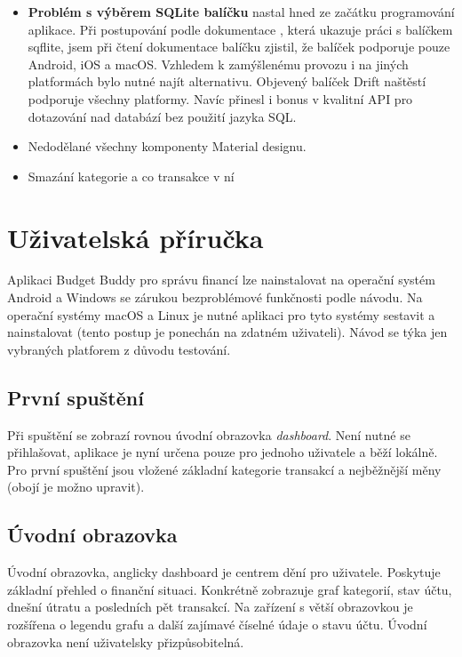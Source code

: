 \documentclass[
  biblatex,
  figures=true,
  tables=false,
  glossaries,
  index
]{kidiplom}
\begin{document}
\begin{itemize}
  \item \textbf{Problém s výběrem SQLite balíčku} nastal hned ze začátku programování aplikace. Při postupování podle dokumentace \cite{flutter-docs}, která ukazuje práci s balíčkem sqflite, jsem při čtení dokumentace balíčku zjistil, že balíček podporuje pouze Android, iOS a macOS. Vzhledem k zamýšlenému provozu i na jiných platformách bylo nutné najít alternativu. Objevený balíček Drift naštěstí podporuje všechny platformy. Navíc přinesl i bonus v kvalitní API pro dotazování nad databází bez použití jazyka SQL.
  \item Nedodělané všechny komponenty Material designu.
  \item Smazání kategorie a co transakce v ní
\end{itemize}

\section{Uživatelská příručka}
Aplikaci Budget Buddy pro správu financí lze nainstalovat na operační systém Android a Windows se zárukou bezproblémové funkčnosti podle návodu. Na operační systémy macOS a Linux je nutné aplikaci pro tyto systémy sestavit a nainstalovat (tento postup je ponechán na zdatném uživateli). Návod se týka jen vybraných platforem z důvodu testování. 

\subsection{První spuštění}
Při spuštění se zobrazí rovnou úvodní obrazovka \textit{dashboard}. Není nutné se přihlašovat, aplikace je nyní určena pouze pro jednoho uživatele a běží lokálně. Pro první spuštění jsou vložené základní kategorie transakcí a nejběžnější měny (obojí je možno upravit). 

\subsection{Úvodní obrazovka}
Úvodní obrazovka, anglicky dashboard je centrem dění pro uživatele. Poskytuje základní přehled o finanční situaci. Konkrétně zobrazuje graf kategorií, stav účtu, dnešní útratu a posledních pět transakcí. Na zařízení s větší obrazovkou je rozšířena o legendu grafu a další zajímavé číselné údaje o stavu účtu. Úvodní obrazovka není uživatelsky přizpůsobitelná.
\end{document}
